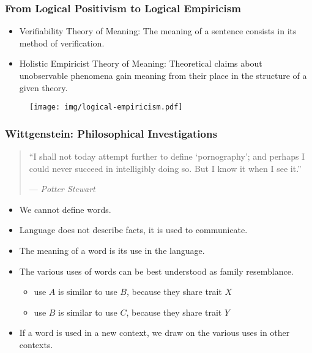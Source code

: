 \documentclass[UTF8,11pt,colorlinks,compress,openany]{beamer}%
\begin{document}
\begin{frame}\frametitle{From Logical Positivism to Logical Empiricism}
\begin{itemize}
	\item Verifiability Theory of Meaning: The meaning of a sentence consists in its method of verification.
	\item Holistic Empiricist Theory of Meaning: Theoretical claims about unobservable phenomena gain meaning from their place in the structure of a given theory.
\end{itemize}
\begin{figure}[H]
\texttt{[image: img/logical-empiricism.pdf]}	
\end{figure}
\end{frame}

\begin{frame}\frametitle{Wittgenstein: Philosophical Investigations}
\begin{quote}
``I shall not today attempt further to define `pornography'; and perhaps I could never succeed in intelligibly doing so. But I know it when I see it.''\par
\hfill --- \textsl{Potter Stewart}	
\end{quote}
\begin{itemize}
	\item We cannot define words.
	\item Language does not describe facts, it is used to communicate.
	\item The meaning of a word is its use in the language.
	\item The various uses of words can be best understood as family resemblance.
	\begin{itemize}
		\item use $A$ is similar to use $B$, because they share trait $X$
		\item use $B$ is similar to use $C$, because they share trait $Y$
	\end{itemize}
	\item If a word is used in a new context, we draw on the various uses in other contexts.
\end{itemize}
\end{frame}
\end{document}
